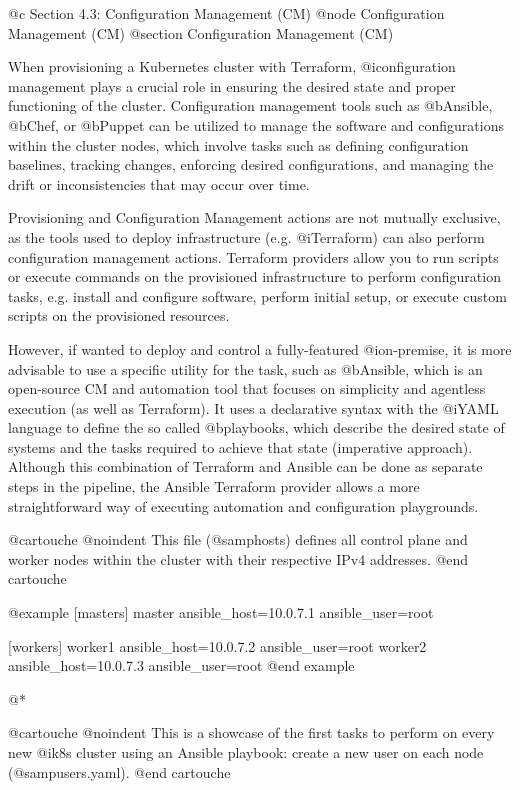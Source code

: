 @c Section 4.3: Configuration Management (CM)
@node Configuration Management (CM)
@section Configuration Management (CM)

When provisioning a Kubernetes cluster with Terraform, @i{configuration management} plays a crucial role in ensuring the desired state and proper functioning of the cluster. Configuration management tools such as @b{Ansible}, @b{Chef}, or @b{Puppet} can be utilized to manage the software and configurations within the cluster nodes, which involve tasks such as defining configuration baselines, tracking changes, enforcing desired configurations, and managing the drift or inconsistencies that may occur over time.

Provisioning and Configuration Management actions are not mutually exclusive, as the tools used to deploy infrastructure (e.g. @i{Terraform}) can also perform configuration management actions. Terraform providers allow you to run scripts or execute commands on the provisioned infrastructure to perform configuration tasks, e.g. install and configure software, perform initial setup, or execute custom scripts on the provisioned resources.

However, if wanted to deploy and control a fully-featured @i{on-premise}, it is more advisable to use a specific utility for the task, such as @b{Ansible}, which is an open-source CM and automation tool that focuses on simplicity and agentless execution (as well as Terraform). It uses a declarative syntax with the @i{YAML} language to define the so called @b{playbooks}, which describe the desired state of systems and the tasks required to achieve that state (imperative approach). Although this combination of Terraform and Ansible can be done as separate steps in the pipeline, the Ansible Terraform provider allows a more straightforward way of executing automation and configuration playgrounds.

@cartouche
@noindent This file (@samp{hosts}) defines all control plane and worker nodes within the cluster with their respective IPv4 addresses.
@end cartouche

@example
[masters]
master ansible_host=10.0.7.1 ansible_user=root

[workers]
worker1 ansible_host=10.0.7.2 ansible_user=root
worker2 ansible_host=10.0.7.3 ansible_user=root
@end example

@*

@cartouche
@noindent This is a showcase of the first tasks to perform on every new @i{k8s cluster} using an Ansible playbook: create a new user on each node (@samp{users.yaml}).
@end cartouche


